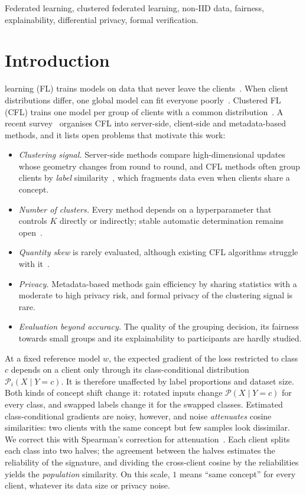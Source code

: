 \documentclass[journal]{IEEEtran}
\theoremstyle{definition}
\newcommand{\cP}{\mathcal{P}}
\begin{document}
\begin{IEEEkeywords}
Federated learning, clustered federated learning, non-IID data, fairness, explainability, differential privacy, formal verification.
\end{IEEEkeywords}

\section{Introduction}
 learning (FL) trains models on data that never leave the clients~\cite{mcmahan2017fedavg,kairouz2021advances}. When client distributions differ, one global model can fit everyone poorly~\cite{zhao2018noniid}. Clustered FL (CFL) trains one model per group of clients with a common distribution~\cite{sattler2021cfl,ghosh2020ifca,briggs2020flhc}. A recent survey~\cite{benali2026survey} organises CFL into server-side, client-side and metadata-based methods, and it lists open problems that motivate this work:
\begin{itemize}
\item \emph{Clustering signal.} Server-side methods compare high-dimensional updates whose geometry changes from round to round, and CFL methods often group clients by \emph{label} similarity~\cite{guo2024fedrc}, which fragments data even when clients share a concept.
\item \emph{Number of clusters.} Every method depends on a hyperparameter that controls $K$ directly or indirectly; stable automatic determination remains open~\cite{benali2026survey}.
\item \emph{Quantity skew} is rarely evaluated, although existing CFL algorithms struggle with it~\cite{benali2025cornflqs}.
\item \emph{Privacy.} Metadata-based methods gain efficiency by sharing statistics with a moderate to high privacy risk, and formal privacy of the clustering signal is rare.
\item \emph{Evaluation beyond accuracy.} The quality of the grouping decision, its fairness towards small groups and its explainability to participants are hardly studied.
\end{itemize}

At a fixed reference model $w$, the expected gradient of the loss restricted to class $c$ depends on a client only through its class-conditional distribution $\cP_i(X\mid Y=c)$. It is therefore unaffected by label proportions and dataset size. Both kinds of concept shift change it: rotated inputs change $\cP(X\mid Y=c)$ for every class, and swapped labels change it for the swapped classes. Estimated class-conditional gradients are noisy, however, and noise \emph{attenuates} cosine similarities: two clients with the same concept but few samples look dissimilar. We correct this with Spearman's correction for attenuation~\cite{spearman1904,brown1910}. Each client splits each class into two halves; the agreement between the halves estimates the reliability of the signature, and dividing the cross-client cosine by the reliabilities yields the \emph{population} similarity. On this scale, $1$ means ``same concept'' for every client, whatever its data size or privacy noise.
\end{document}
